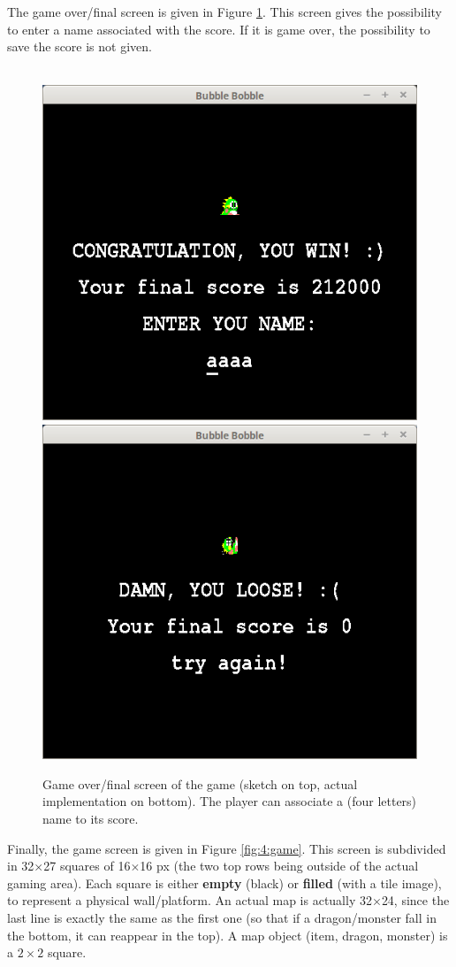 \documentclass[12pt,a4paper]{article}
\begin{document}
The game over/final screen is given in Figure \ref{fig:3:gameover}. This screen gives the possibility to enter a name associated with the score. If it is game over, the possibility to save the score is not given.

\begin{figure}[!h]
	\centering
	 \\
	\vspace{.5cm}
			\includegraphics[width=.45\linewidth]{i/screen4}\hspace{.5cm}
			\includegraphics[width=.45\linewidth]{i/screen4b}
	\caption{Game over/final screen of the game (sketch on top, actual implementation on bottom). The player can associate a (four letters) name to its score.}
	\label{fig:3:gameover}
\end{figure}

Finally, the game screen is given in Figure \ref{fig:4:game}. This screen is subdivided in 32$\times$27 squares of 16$\times$16 px (the two top rows being outside of the actual gaming area). Each square is either \textbf{empty} (black) or \textbf{filled} (with a tile image), to represent a physical wall/platform. An actual map is actually 32$\times$24, since the last line is exactly the same as the first one (so that if a dragon/monster fall in the bottom, it can reappear in the top). A map object (item, dragon, monster) is a $2\times2$ square.
\end{document}
